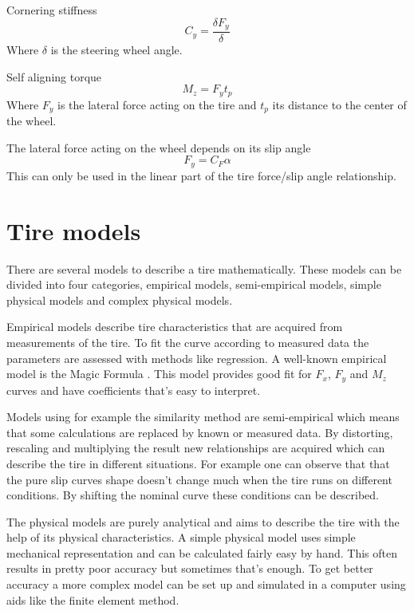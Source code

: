 Cornering stiffness
\begin{equation}
C_{y} = \frac{\delta F_{y}}{\delta}
\end{equation}
Where $\delta$ is the steering wheel angle.

Self aligning torque
\begin{equation}
M_{z} = F_{y}t_{p}
\end{equation}
Where $ F_{y} $  is the lateral force acting on the tire and $ t_{p} $ its distance to the center of the wheel. 

The lateral force acting on the wheel depends on its slip angle
\begin{equation}
F_{y}=C_{F}\alpha
\end{equation}
This can only be used in the linear part of the tire force/slip angle relationship. 

\section{Tire models}
There are several models to describe a tire mathematically. These models can be divided into four categories, empirical models, semi-empirical models, simple physical models and complex physical  models. 

Empirical models describe tire characteristics that are acquired from measurements of the tire. To fit the curve according to measured data the parameters are assessed with methods like regression. A well-known empirical model is the Magic Formula \cite{pacejka}. This model provides good fit for $F_{x}$, $F_{y}$ and $M_{z}$ curves and have coefficients that's easy to interpret.

Models using for example the similarity method are semi-empirical which means that some calculations are replaced by known or measured data. By distorting, rescaling and multiplying the result new relationships are acquired which can describe the tire in different situations. For example one can observe that that the pure slip curves shape doesn't change much \cite{pacejka} when the tire runs on different conditions. By shifting the nominal curve these conditions can be described.

The physical models are purely analytical and aims to describe the tire with the help of its physical characteristics. A simple physical model uses simple mechanical representation and can be calculated fairly easy by hand. This often results in pretty poor accuracy but sometimes that's enough. To get better accuracy a more complex model can be set up and simulated in a computer using aids like the finite element method. 


